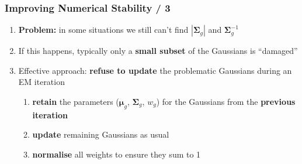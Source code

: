 \documentclass[usenames,dvipsnames]{beamer}
\def\Mat#1{{\boldsymbol{#1}}}
\begin{document}
\begin{frame}
\frametitle{Improving Numerical Stability / 3}

\begin{enumerate}[{~~$\boldsymbol{\bullet}$}]

\item {\bf Problem:} in some situations we still can't find $|\Mat{\Sigma}_g|$ and $\Mat{\Sigma}_g^{-1}$
\vspace{1ex}

\item If this happens, typically only a {\bf small subset} of the Gaussians is ``damaged''
\vspace{1ex}

\item Effective approach: {\bf refuse to update} the problematic Gaussians during an EM iteration

\begin{enumerate}[{$\boldsymbol{\rightarrow}$}]
\renewcommand{\itemsep}{1ex}
\item {\bf retain} the parameters ($\Mat{\mu}_g$, $\Mat{\Sigma}_g$, $w_g$) for the Gaussians from the {\bf previous iteration}
\item {\bf update} remaining Gaussians as usual
\item {\bf normalise} all weights to ensure they sum to 1
\end{enumerate}
\vspace{1ex}


\end{enumerate}
\end{frame}

%
%
%
\end{document}
